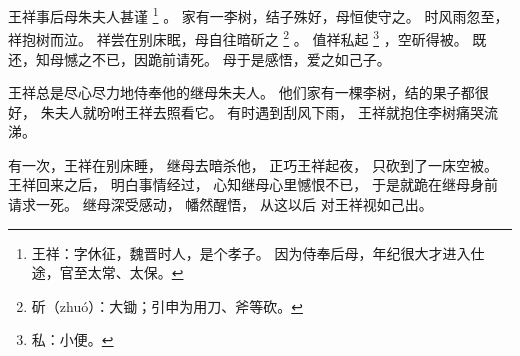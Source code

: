 
\switchcolumn*[\section{}]

王祥事后母朱夫人甚谨%
\footnote{%
    王祥：字休征，魏晋时人，是个孝子。
          因为侍奉后母，年纪很大才进入仕途，官至太常、太保。
}%
。
家有一李树，结子殊好，母恒使守之。
时风雨忽至，祥抱树而泣。
祥尝在别床眠，母自往暗斫之%
\footnote{%
    斫（zhuó）：大锄；引申为用刀、斧等砍。
}%
。
值祥私起%
\footnote{%
    私：小便。
}%
，空斫得被。
既还，知母憾之不已，因跪前请死。
母于是感悟，爱之如己子。

\switchcolumn

王祥总是尽心尽力地侍奉他的继母朱夫人。
他们家有一棵李树，结的果子都很好，
朱夫人就吩咐王祥去照看它。
有时遇到刮风下雨，
王祥就抱住李树痛哭流涕。

有一次，王祥在别床睡，
继母去暗杀他，
正巧王祥起夜，
只砍到了一床空被。
王祥回来之后，
明白事情经过，
心知继母心里憾恨不已，
于是就跪在继母身前
请求一死。
继母深受感动，
幡然醒悟，
从这以后
对王祥视如己出。

